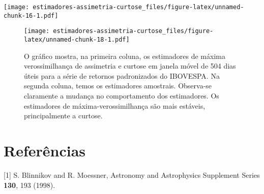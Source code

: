\documentclass[]{article}
\begin{document}
\texttt{[image: estimadores-assimetria-curtose\_files/figure-latex/unnamed-chunk-16-1.pdf]}

\begin{figure}
\centering
\texttt{[image: estimadores-assimetria-curtose\_files/figure-latex/unnamed-chunk-18-1.pdf]}
\caption{\label{fig:mle-skewness-kurtosis-ma} O gráfico mostra, na
primeira coluna, os estimadores de máxima verossimilhança de assimetria
e curtose em janela móvel de 504 dias úteis para a série de retornos
padronizados do IBOVESPA. Na segunda coluna, temos os estimadores
amostrais. Observa-se claramente a mudança no comportamento dos
estimadores. Os estimadores de máxima-verossimilhança são mais estáveis,
principalmente a curtose.}
\end{figure}

\section*{Referências}\label{referencias}

\hypertarget{refs}{}
\hypertarget{ref-blinnikov1998}{}
{[}1{]} S. Blinnikov and R. Moessner, Astronomy and Astrophysics
Supplement Series \textbf{130}, 193 (1998).
\end{document}
